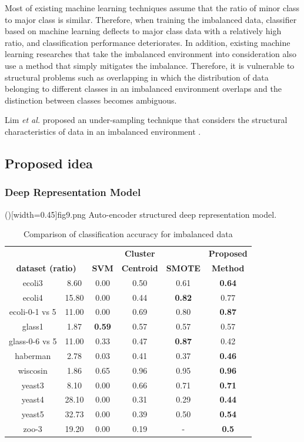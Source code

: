 \documentclass{ieeeaccess}
\begin{document}
Most of existing machine learning techniques assume that the ratio of minor class to major class is similar.
Therefore, when training the imbalanced data, classifier based on machine learning deflects to major class data with a relatively high ratio, and classification performance deteriorates.
In addition, existing machine learning researches that take the imbalanced environment into consideration also use a method that simply mitigates the imbalance.
Therefore, it is vulnerable to structural problems such as overlapping in which the distribution of data belonging to different classes in an imbalanced environment overlaps and the distinction between classes becomes ambiguous.

Lim \textit{et al.} proposed an under-sampling technique that considers the structural characteristics of data in an imbalanced environment \cite{paper5}.

\subsection{Proposed idea}
\subsubsection{Deep Representation Model}

\Figure[t]()[width=0.45\textwidth]{fig9.png}
   {Auto-encoder structured deep representation model.\label{fig9}}

\begin{table}[t]
	\centering
	\caption{Comparison of classification accuracy for imbalanced data}
		\begin{tabular}{|c|c|c|c|c|c|}
			\hline
			\multicolumn{2}{|c|}{} & & \textbf{Cluster} & & \textbf{Proposed} \\ 
			\multicolumn{2}{|c|}{\textbf{dataset (ratio)}} & \textbf{SVM} & \textbf{Centroid} & \textbf{SMOTE} & \textbf{Method} \\ \hline \hline
			ecoli3 & 8.60 & 0.00 & 0.50 & 0.61 & \textbf{0.64} \\ \hline
			ecoli4 & 15.80 & 0.00 & 0.44 & \textbf{0.82} & 0.77 \\ \hline
			ecoli-0-1 vs 5 & 11.00 & 0.00 & 0.69 & 0.80 & \textbf{0.87} \\ \hline
			glass1 & 1.87 & \textbf{0.59} & 0.57 & 0.57 & 0.57 \\ \hline
			glass-0-6 vs 5 & 11.00 & 0.33 & 0.47 & \textbf{0.87} & 0.42 \\ \hline
			haberman & 2.78 & 0.03 & 0.41 & 0.37 & \textbf{0.46} \\ \hline
			wiscosin & 1.86 & 0.65 & 0.96 & 0.95 & \textbf{0.96} \\ \hline
			yeast3 & 8.10 & 0.00 & 0.66 & 0.71 & \textbf{0.71} \\ \hline
			yeast4 & 28.10 & 0.00 & 0.31 & 0.29 & \textbf{0.44} \\ \hline
			yeast5 & 32.73 & 0.00 & 0.39 & 0.50 & \textbf{0.54} \\ \hline
			zoo-3 & 19.20 & 0.00 & 0.19 & - & \textbf{0.5} \\ \hline			
		\end{tabular}
	\label{table7}
\end{table}
\end{document}
